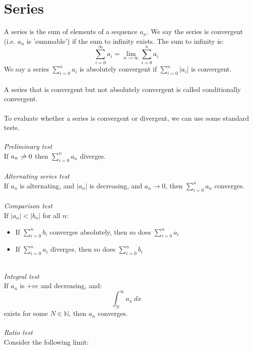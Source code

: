 \documentclass{scrartcl}
\newcommand{\N}{\mathbb{N}}
\begin{document}
\section{Series} \label{series}
A series is the sum of elements of a sequence $ a_{n} $. We say the series is convergent (i.e. $ a_{n} $ is 'summable') if the sum to infinity exists. The sum to infinity is:
\begin{equation}
\sum_{i=0}^{\infty} a_{i} = \lim_{n \to \infty} \sum_{i=0}^{n} a_{i}
\end{equation}
We say a series $ \sum_{i=0}^{n} a_{i} $ is absolutely convergent if $ \sum_{i=0}^{n} |a_{i}| $ is convergent.
\\\\
A series that is convergent but not absolutely convergent is called conditionally convergent.
\\\\
To evaluate whether a series is convergent or divergent, we can use some standard tests.
\\\\
\textit{Preliminary test}
\\
If $ a_{n} \centernot\to 0 $ then $ \sum_{i=0}^{n} a_{n} $ diverges.
\\\\
\textit{Alternating series test}
\\
If $ a_{n} $ is alternating, and $ |a_{n}| $ is decreasing, and $ a_{n} \to 0 $, then 
$ \sum_{i=0}^{n} a_{n} $ converges.
\\\\
\textit{Comparison test}
\\
If $ |a_{n}| < |b_{n}| $ for all $ n $:
\begin{itemize}
\item If $ \sum_{i=0}^{n} b_{i} $ converges absolutely, then so does $ \sum_{i=0}^{n} a_{i} $
\item If $ \sum_{i=0}^{n} a_{i} $ diverges, then so does $ \sum_{i=0}^{n} b_{i} $
\end{itemize}
\noindent
\\
\textit{Integral test}
\\
If $ a_{n} $ is $ +ve $ and decreasing, and:
\begin{equation}
\int_{N}^{\infty} a_{x} \ dx
\end{equation}
exists for some $ N \in \N $, then $ a_{n} $ converges.
\\\\
\textit{Ratio test}
\\
Consider the following limit:
\end{document}
